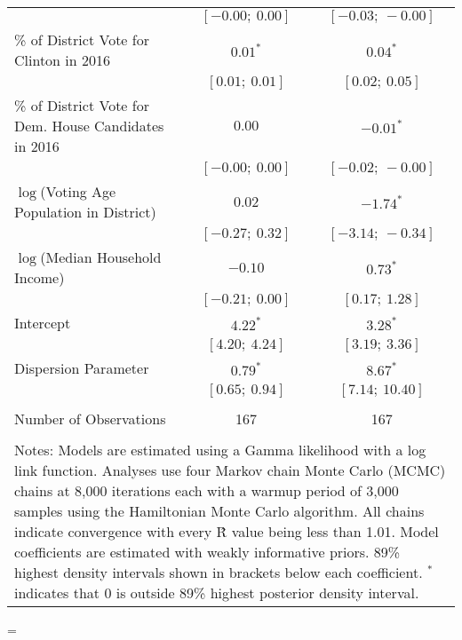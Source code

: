 \begin{table}[h]
\begin{center}
{{\begin{tabular}{@{\extracolsep{5pt}}l c c }
          & $[-0.00;\ 0.00]$  & $[-0.03;\ -0.00]$ \\
\quad \% of District Vote for Clinton in 2016  & $0.01^{*}$        & $0.04^{*}$        \\
          & $[0.01;\ 0.01]$   & $[0.02;\ 0.05]$   \\
\quad \% of District Vote for Dem. House Candidates in 2016  & $0.00$            & $-0.01^{*}$       \\
          & $[-0.00;\ 0.00]$  & $[-0.02;\ -0.00]$ \\
\quad $\log$(Voting Age Population in District)   & $0.02$            & $-1.74^{*}$       \\
          & $[-0.27;\ 0.32]$  & $[-3.14;\ -0.34]$ \\
\quad $\log$(Median Household Income)    & $-0.10$           & $0.73^{*}$        \\
          & $[-0.21;\ 0.00]$  & $[0.17;\ 1.28]$   \\
\quad Intercept         & $4.22^{*}$        & $3.28^{*}$        \\
          & $[4.20;\ 4.24]$   & $[3.19;\ 3.36]$   \\
Dispersion Parameter     & $0.79^{*}$        & $8.67^{*}$        \\
          & $[0.65;\ 0.94]$   & $[7.14;\ 10.40]$  \\
\midrule  \\[-1.8ex]
Number of Observations & 167 & 167 \\
\bottomrule  \\[-1.8ex]
\multicolumn{3}{p{\linewidth}}{Notes: Models are estimated using a Gamma likelihood with a log link function. Analyses use four Markov chain Monte Carlo (MCMC) chains at 8,000 iterations each with a warmup period of 3,000 samples using the Hamiltonian Monte Carlo algorithm. All chains indicate convergence with every \^{R} value being less than 1.01. Model coefficients are estimated with weakly informative priors. 89\% highest density intervals shown in brackets below each coefficient. $^*$ indicates that 0 is outside 89\% highest posterior density interval.}
\end{tabular}}
=\hbox{\contents}
	\setlength{\linewidth}{\wd0-2\tabcolsep-.25em}
	\contents
}
\end{center}
\end{table}
